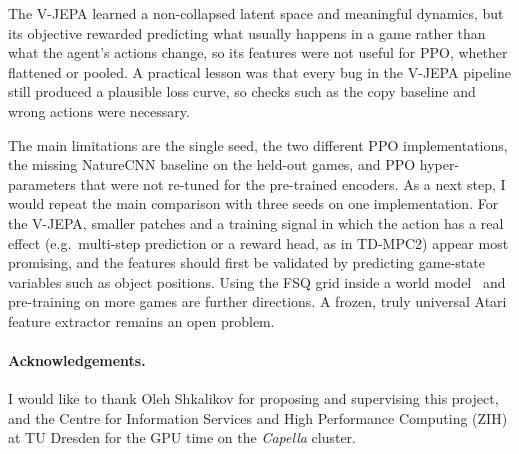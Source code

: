 \documentclass[runningheads]{llncs}
\begin{document}
The V-JEPA learned a non-collapsed latent space and meaningful dynamics, but its objective
rewarded predicting what usually happens in a game rather than what the agent's actions change,
so its features were not useful for PPO, whether flattened or pooled. A practical lesson was that every bug in the V-JEPA pipeline still produced a plausible loss
curve, so checks such as the copy baseline and wrong actions were necessary.

The main limitations are the single seed, the two different PPO implementations, the missing
NatureCNN baseline on the held-out games, and PPO hyper-parameters that were not re-tuned for
the pre-trained encoders. As a next step, I would repeat the main comparison with three seeds
on one implementation. For the V-JEPA, smaller patches and a training signal in which the
action has a real effect (e.g.\ multi-step prediction or a reward head, as in TD-MPC2) appear
most promising, and the features should first be validated by predicting game-state variables
such as object positions. Using the FSQ grid inside a world
model~\cite{hafner2021dreamerv2,micheli2023iris} and pre-training on more games are further
directions. A frozen, truly universal Atari feature extractor remains an open problem.

\paragraph{Acknowledgements.}
I would like to thank Oleh Shkalikov for proposing and supervising this project, and the
Centre for Information Services and High Performance Computing (ZIH) at TU Dresden for the GPU
time on the \emph{Capella} cluster.



\end{document}
